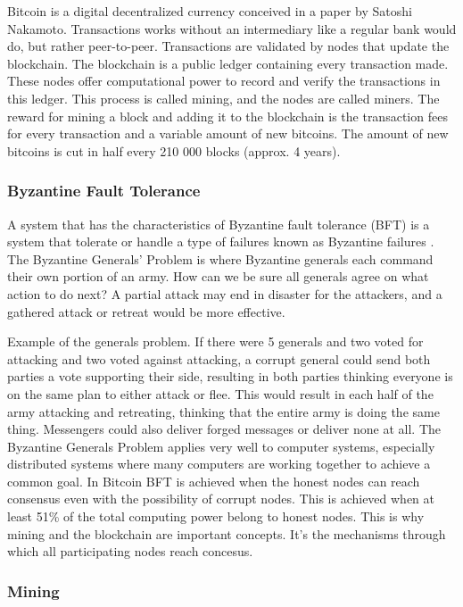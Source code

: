 \documentclass[12pt]{article}
\begin{document}
Bitcoin is a digital decentralized currency conceived in a paper by Satoshi Nakamoto\cite{nakamoto2009bitcoin}. Transactions works without an intermediary like a regular bank would do, but rather peer-to-peer. Transactions are validated by nodes that update the blockchain. The blockchain is a public ledger containing every transaction made. These nodes offer computational power to record and verify the transactions in this ledger. This process is called mining, and the nodes are called miners. The reward for mining a block and adding it to the blockchain is the transaction fees for every transaction and a variable amount of new bitcoins. The amount of new bitcoins is cut in half every 210 000 blocks (approx. 4 years).

\subsubsection{Byzantine Fault Tolerance}

A system that has the characteristics of Byzantine fault tolerance (BFT) is a system that tolerate or handle a type of failures known as Byzantine failures \cite{lamport1982byzantine}. The Byzantine Generals' Problem is where Byzantine generals each command their own portion of an army. How can we be sure all generals agree on what action to do next? A partial attack may end in disaster for the attackers, and a gathered attack or retreat would be more effective.

Example of the generals problem. If there were 5 generals and two voted for attacking and two voted against attacking, a corrupt general could send both parties a vote supporting their side, resulting in both parties thinking everyone is on the same plan to either attack or flee. This would result in each half of the army attacking and retreating, thinking that the entire army is doing the same thing.  Messengers could also deliver forged messages or deliver none at all. The Byzantine Generals Problem applies very well to computer systems, especially distributed systems where many computers are working together to achieve a common goal. In Bitcoin BFT is achieved when the honest nodes can reach consensus even with the possibility of corrupt nodes. This is achieved when at least 51\% of the total computing power belong to honest nodes\cite{nakamoto2009bitcoin}\cite{tschorsch2015bitcoin}. This is why mining and the blockchain are important concepts. It's the mechanisms through which all participating nodes reach concesus.
 
\subsubsection{Mining}\label{subsubsec:mining}
\end{document}
